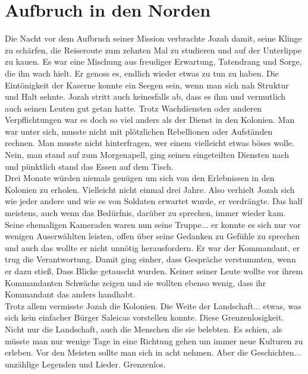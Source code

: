 \chapter{Aufbruch in den Norden}

Die Nacht vor dem Aufbruch seiner Mission verbrachte Jozah damit, seine Klinge zu schärfen, die 
Reiseroute zum zehnten Mal zu studieren und auf der Unterlippe zu kauen. Es war eine Mischung aus 
freudiger Erwartung, Tatendrang und Sorge, die ihn wach hielt. Er genoss es, endlich wieder etwas zu 
tun zu haben. Die Eintönigkeit der Kaserne konnte ein Seegen sein, wenn man sich nah Struktur und 
Halt sehnte. Jozah stritt auch keinesfalls ab, dass es ihm und vermutlich auch seinen Leuten gut 
getan hatte. Trotz Wachdiensten oder anderen Verpflichtungen war es doch so viel anders als der 
Dienst in den Kolonien. Man war unter sich, musste nicht mit plötzlichen Rebellionen oder 
Aufständen rechnen. Man musste nicht hinterfragen, wer einem vielleicht etwas böses wolle. Nein, 
man stand auf zum Morgenapell, ging seinen eingeteilten Diensten nach und pünktlich stand das Essen 
auf dem Tisch. \\
Drei Monate würden niemals genügen um sich von den Erlebnissen in den Kolonien zu erholen. 
Vielleicht nicht einmal drei Jahre. Also verhielt Jozah sich wie jeder andere und wie es von 
Soldaten erwartet wurde, er verdrängte. Das half meistens, auch wenn das Bedürfnis, darüber zu 
sprechen, immer wieder kam. Seine ehemaligen Kameraden waren nun seine Truppe... er konnte es sich 
nur vor wenigen Auserwählten leisten, offen über seine Gedanken zu Gefühle zu sprechen und auch das 
wollte er nicht unnötig herausfordern. Er war der Kommandant, er trug die Verantwortung. Damit ging 
einher, dass Gespräche verstummten, wenn er dazu stieß, Dass Blicke getauscht wurden. Keiner seiner 
Leute wollte vor ihrem Kommandanten Schwäche zeigen und sie wollten ebenso wenig, dass ihr 
Kommandant das anders handhabt. \\
Trotz allem vermisste Jozah die Kolonien. Die Weite der Landschaft... etwas, was sich kein 
einfacher Bürger Saleicas vorstellen konnte. Diese Grenzenlosigkeit. Nicht nur die Landschaft, auch 
die Menschen die sie belebten. Es schien, als müsste man nur wenige Tage in eine Richtung gehen um 
immer neue Kulturen zu erleben. Vor den Meisten sollte man sich in acht nehmen. Aber die 
Geschichten... unzählige Legenden und Lieder. Grenzenlos.\\

